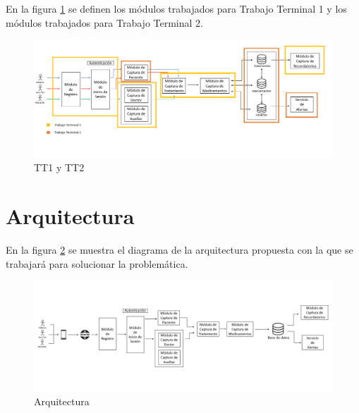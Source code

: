 En la figura \ref{fig:arquitectura3} se definen los módulos trabajados para Trabajo Terminal 1 y los módulos trabajados para Trabajo Terminal 2. 

\begin{figure}[htb]
	\centering
	\includegraphics[width=1\textwidth]{images/cap2/Arquitectura3_1}
	\caption{TT1 y TT2} \label{fig:arquitectura3}
\end{figure}


\newpage
\section{Arquitectura}

En la figura \ref{fig:arquitectura1} se muestra el diagrama de la arquitectura propuesta con la que se trabajará para solucionar la problemática.


\begin{figure}[htb]
	\centering
	\includegraphics[width=1\textwidth]{images/cap2/Arquitectura4_1}
	\caption{Arquitectura} \label{fig:arquitectura1}
\end{figure}

